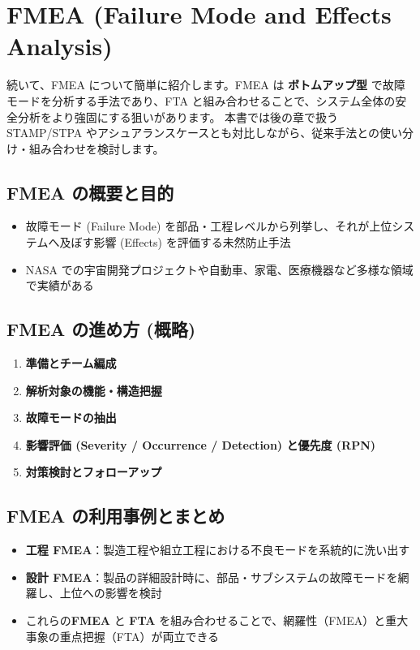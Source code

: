 \section{FMEA (Failure Mode and Effects Analysis)}
\label{sec:FMEA}

続いて、FMEA について簡単に紹介します。FMEA は \textbf{ボトムアップ型} で故障モードを分析する手法であり、FTA と組み合わせることで、システム全体の安全分析をより強固にする狙いがあります。  
本書では後の章で扱う STAMP/STPA やアシュアランスケースとも対比しながら、従来手法との使い分け・組み合わせを検討します。

\subsection{FMEA の概要と目的}

\begin{itemize}
 \item 故障モード (Failure Mode) を部品・工程レベルから列挙し、それが上位システムへ及ぼす影響 (Effects) を評価する未然防止手法
 \item NASA での宇宙開発プロジェクトや自動車、家電、医療機器など多様な領域で実績がある
\end{itemize}

\subsection{FMEA の進め方 (概略)}

\begin{enumerate}
 \item \textbf{準備とチーム編成}
 \item \textbf{解析対象の機能・構造把握}
 \item \textbf{故障モードの抽出}
 \item \textbf{影響評価 (Severity / Occurrence / Detection) と優先度 (RPN)}
 \item \textbf{対策検討とフォローアップ}
\end{enumerate}

\subsection{FMEA の利用事例とまとめ}

\begin{itemize}
 \item \textbf{工程 FMEA}：製造工程や組立工程における不良モードを系統的に洗い出す
 \item \textbf{設計 FMEA}：製品の詳細設計時に、部品・サブシステムの故障モードを網羅し、上位への影響を検討
 \item これらの\textbf{FMEA} と \textbf{FTA} を組み合わせることで、網羅性（FMEA）と重大事象の重点把握（FTA）が両立できる
\end{itemize}


